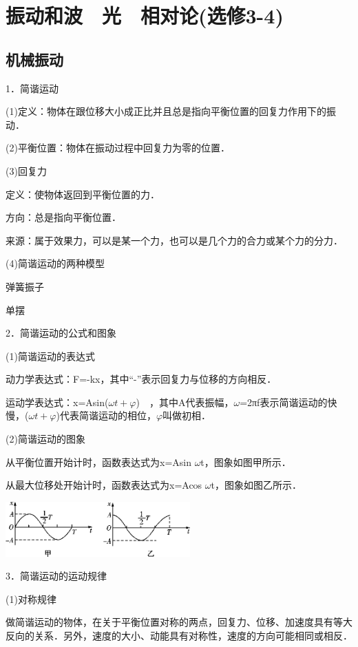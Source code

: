 \chapter{振动和波　光　相对论(选修3-4)}

\section{机械振动}


1．简谐运动

(1)定义：物体在跟位移大小成正比并且总是指向平衡位置的回复力作用下的振动．

(2)平衡位置：物体在振动过程中回复力为零的位置．

(3)回复力

定义：使物体返回到平衡位置的力．

方向：总是指向平衡位置．

来源：属于效果力，可以是某一个力，也可以是几个力的合力或某个力的分力．

(4)简谐运动的两种模型

弹簧振子

单摆

2．简谐运动的公式和图象

(1)简谐运动的表达式

动力学表达式：F=-kx，其中``-''表示回复力与位移的方向相反．

运动学表达式：x=Asin($\omega t+\varphi$)　，其中A代表振幅，$\omega$=2πf表示简谐运动的快慢，($\omega t+\varphi$)代表简谐运动的相位，$\varphi$叫做初相．

(2)简谐运动的图象

从平衡位置开始计时，函数表达式为x=Asin $\omega$t，图象如图甲所示．

从最大位移处开始计时，函数表达式为x=Acos $\omega$t，图象如图乙所示．

\begin{center}\includegraphics[width=2.79236in,height=0.82986in]{media/image511.png}\end{center}

3．简谐运动的运动规律

(1)对称规律

做简谐运动的物体，在关于平衡位置对称的两点，回复力、位移、加速度具有等大反向的关系．另外，速度的大小、动能具有对称性，速度的方向可能相同或相反．

